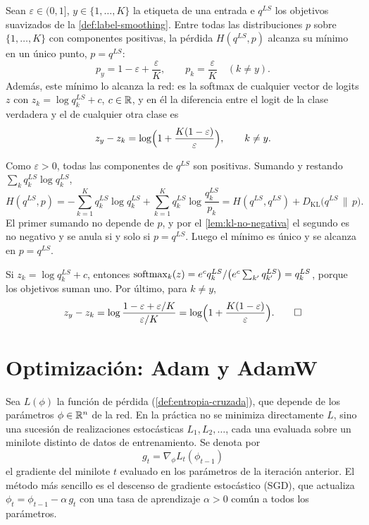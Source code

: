 \begin{proposicion}\label{prop:ls-optimo}
Sean $\varepsilon\in(0,1]$, $y\in\{1,\dots,K\}$ la etiqueta de una entrada e
$q^{LS}$ los objetivos suavizados de la \cref{def:label-smoothing}. Entre todas las
distribuciones $p$ sobre $\{1,\dots,K\}$ con componentes positivas, la pérdida
$H(q^{LS}, p)$ alcanza su mínimo en un único punto, $p = q^{LS}$:
\[
  p_y = 1 - \varepsilon + \frac{\varepsilon}{K}, \qquad
  p_k = \frac{\varepsilon}{K} \quad (k \ne y).
\]
Además, este mínimo lo alcanza la red: es la softmax de cualquier vector de logits
$z$ con $z_k = \log q^{LS}_k + c$, $c\in\mathbb{R}$, y en él la diferencia entre el logit de
la clase verdadera y el de cualquier otra clase es
\[
  z_y - z_k = \log\Bigl(1 + \frac{K(1-\varepsilon)}{\varepsilon}\Bigr), \qquad k \ne y.
\]
\end{proposicion}
\begin{demostracion}
Como $\varepsilon > 0$, todas las componentes de $q^{LS}$ son positivas. Sumando y
restando $\sum_k q^{LS}_k \log q^{LS}_k$,
\[
  H(q^{LS}, p) = -\sum_{k=1}^{K} q^{LS}_k \log q^{LS}_k
               + \sum_{k=1}^{K} q^{LS}_k \log\frac{q^{LS}_k}{p_k}
             = H(q^{LS}, q^{LS}) + D_{\mathrm{KL}}\bigl(q^{LS}\,\|\,p\bigr).
\]
El primer sumando no depende de $p$, y por el \cref{lem:kl-no-negativa} el segundo
es no negativo y se anula si y solo si $p = q^{LS}$. Luego el mínimo es único y se
alcanza en $p = q^{LS}$.

Si $z_k = \log q^{LS}_k + c$, entonces
$\operatorname{softmax}_k(z) = e^{c}q^{LS}_k / \bigl(e^{c}\sum_{k'} q^{LS}_{k'}\bigr) = q^{LS}_k$,
porque los objetivos suman uno. Por último, para $k \ne y$,
\[
  z_y - z_k = \log\frac{1 - \varepsilon + \varepsilon/K}{\varepsilon/K}
            = \log\Bigl(1 + \frac{K(1-\varepsilon)}{\varepsilon}\Bigr). \qedhere
\]
\end{demostracion}

\section{Optimización: Adam y AdamW}\label{sec:adamw}

Sea $L(\phi)$ la función de pérdida (\cref{def:entropia-cruzada}), que depende de los parámetros
$\phi \in \mathbb{R}^n$ de la red. En la práctica no se minimiza directamente
$L$, sino una sucesión de realizaciones estocásticas $L_1, L_2, \dots$, cada una
evaluada sobre un minilote distinto de datos de entrenamiento. Se denota por
\[
  g_t = \nabla_\phi L_t(\phi_{t-1})
\]
el gradiente del minilote $t$ evaluado en los parámetros de la iteración
anterior. El método más sencillo es el descenso de gradiente estocástico (SGD),
que actualiza $\phi_t = \phi_{t-1} - \alpha\, g_t$ con una tasa de aprendizaje
$\alpha > 0$ común a todos los parámetros.

